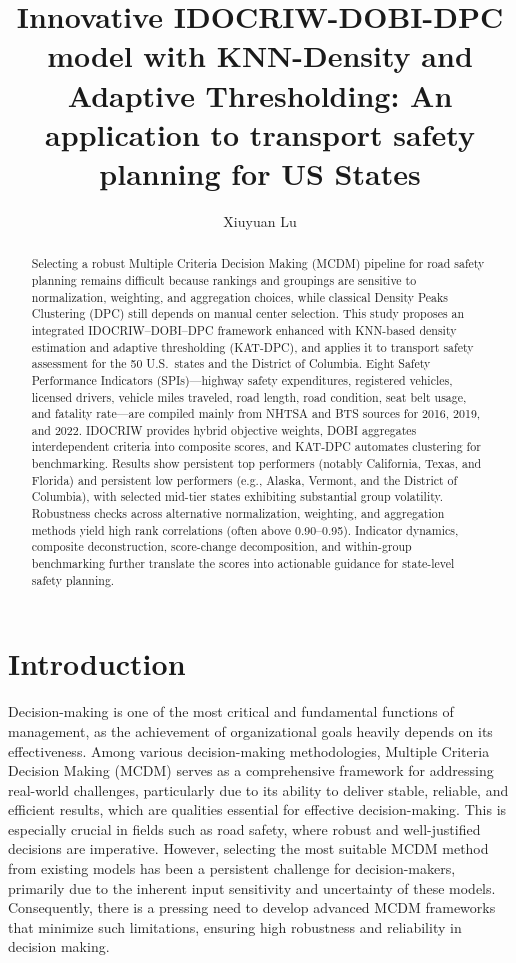 \documentclass{article}
\author{Xiuyuan Lu}
\date{} %
\title{Innovative IDOCRIW-DOBI-DPC model with KNN-Density and Adaptive Thresholding: An application to transport safety planning for US States}
\begin{document}
\maketitle

\begin{abstract}
Selecting a robust Multiple Criteria Decision Making (MCDM) pipeline for road safety planning remains difficult because rankings and groupings are sensitive to normalization, weighting, and aggregation choices, while classical Density Peaks Clustering (DPC) still depends on manual center selection. This study proposes an integrated IDOCRIW--DOBI--DPC framework enhanced with KNN-based density estimation and adaptive thresholding (KAT-DPC), and applies it to transport safety assessment for the 50 U.S.\ states and the District of Columbia. Eight Safety Performance Indicators (SPIs)---highway safety expenditures, registered vehicles, licensed drivers, vehicle miles traveled, road length, road condition, seat belt usage, and fatality rate---are compiled mainly from NHTSA and BTS sources for 2016, 2019, and 2022. IDOCRIW provides hybrid objective weights, DOBI aggregates interdependent criteria into composite scores, and KAT-DPC automates clustering for benchmarking. Results show persistent top performers (notably California, Texas, and Florida) and persistent low performers (e.g., Alaska, Vermont, and the District of Columbia), with selected mid-tier states exhibiting substantial group volatility. Robustness checks across alternative normalization, weighting, and aggregation methods yield high rank correlations (often above 0.90--0.95). Indicator dynamics, composite deconstruction, score-change decomposition, and within-group benchmarking further translate the scores into actionable guidance for state-level safety planning.
\end{abstract}

\newpage
\tableofcontents
\newpage

\section{Introduction}
Decision-making is one of the most critical and fundamental functions of management, as the achievement of organizational goals heavily depends on its effectiveness. Among various decision-making methodologies, Multiple Criteria Decision Making (MCDM) serves as a comprehensive framework for addressing real-world challenges, particularly due to its ability to deliver stable, reliable, and efficient results, which are qualities essential for effective decision-making. This is especially crucial in fields such as road safety, where robust and well-justified decisions are imperative. However, selecting the most suitable MCDM method from existing models has been a persistent challenge for decision-makers, primarily due to the inherent input sensitivity and uncertainty of these models. Consequently, there is a pressing need to develop advanced MCDM frameworks that minimize such limitations, ensuring high robustness and reliability in decision making.
\end{document}
